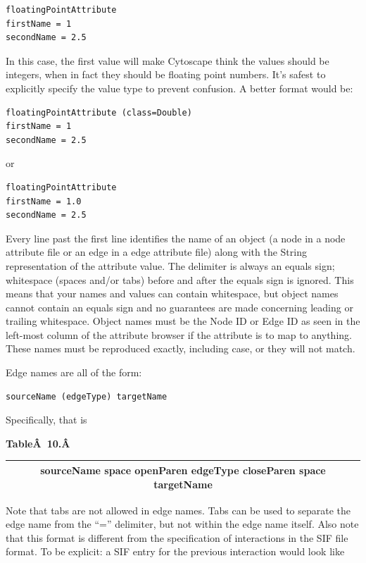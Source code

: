  \begin{verbatim}
floatingPointAttribute
firstName = 1
secondName = 2.5
\end{verbatim}

 In this case, the first value will make Cytoscape think the values should be
integers, when in fact they should be floating point numbers. It's safest to
explicitly specify the value type to prevent confusion. A better format would
be: 


 \begin{verbatim}
floatingPointAttribute (class=Double)
firstName = 1
secondName = 2.5
\end{verbatim}

 or 

 \begin{verbatim}
floatingPointAttribute 
firstName = 1.0
secondName = 2.5
\end{verbatim}

 Every line past the first line identifies the name of an object (a node in a
node attribute file or an edge in a edge attribute file) along with the String
representation of the attribute value. The delimiter is always an equals sign;
whitespace (spaces and/or tabs) before and after the equals sign is ignored.
This means that your names and values can contain whitespace, but object names
cannot contain an equals sign and no guarantees are made concerning leading or
trailing whitespace. Object names must be the Node ID or Edge ID as seen in the
left-most column of the attribute browser if the attribute is to map to
anything. These names must be reproduced exactly, including case, or they will
not match. 

Edge names are all of the form: 

 \begin{verbatim}
sourceName (edgeType) targetName
\end{verbatim}

 Specifically, that is 

 \textbf{Table\^A 10.\^A }

\begin{tabular}{|c|}
 \hline 
 sourceName space openParen edgeType closeParen space targetName \\
 \hline 
\end{tabular}

 Note that tabs are not allowed in edge names. Tabs can be used to separate the
edge name from the ``='' delimiter, but not within the edge name itself. Also
note that this format is different from the specification of interactions in
the SIF file format. To be explicit: a SIF entry for the previous interaction
would look like 

